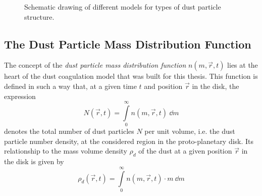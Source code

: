 \begin{figure}[h!]
\begin{minipage}{.5\linewidth}
{
              	}
                \vspace{1cm}
            \end{minipage}
            \caption{
                Schematic drawing of different models for types of dust particle structure. %
            }
            \label{fig:shapes_of_dust_particles}
        \end{figure}

\clearpage\subsection{The Dust Particle Mass Distribution Function}
\label{sec:dust_particle_mass_distribution}

    The concept of the \textit{dust particle mass distribution function} $n(m, \vec r, t)$ 
    lies at the heart of the dust coagulation model that was built for this thesis. 
    This function is defined in such a way that, at a given time $t$ and position $\vec r$ 
    in the disk, the expression
    \begin{equation}
        N(\vec r, t) =\int\limits_0^\infty n(m,\vec r, t)\ \dd m
    \end{equation}
    denotes the total number of dust particles $N$ per unit volume, i.e. the dust particle
    number density, at the considered region in the proto-planetary disk. 
    Its relationship to the mass volume density $\rho_d$ of the dust at a given position 
    $\vec r$ in the disk is given by
    \begin{equation}
        \label{eq:relationship_between_dust_particle_mass_distribution_and_mass_volume_density}
        \rho_d(\vec r, t) =\int\limits_0^\infty n(m,\vec r, t)\cdot m\ \dd m
    \end{equation}

